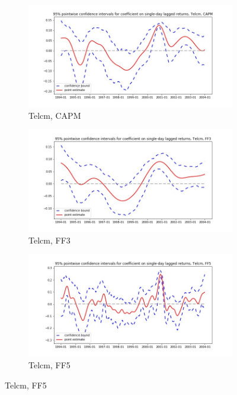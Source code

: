 \documentclass{article}
\begin{document}
  \begin{figure}
  \centering
  \begin{subfigure}[b]{0.3\textwidth}
    \centering
    \includegraphics[width=\textwidth]{Telcm/pointwiseCIs_CAPM.jpg}
    \caption{Telcm, CAPM}
    \label{fig:1}
  \end{subfigure}
  \begin{subfigure}[b]{0.3\textwidth}
    \centering
    \includegraphics[width=\textwidth]{Telcm/pointwiseCIs_FF3.jpg}
    \caption{Telcm, FF3}
    \label{fig:2}
  \end{subfigure}
    \begin{subfigure}[b]{0.3\textwidth}
    \centering
    \includegraphics[width=\textwidth]{Telcm/pointwiseCIs_FF5.jpg}
    \caption{Telcm, FF5}
    \label{fig:1}
  \end{subfigure}
  \end{figure}
  
\end{document}
